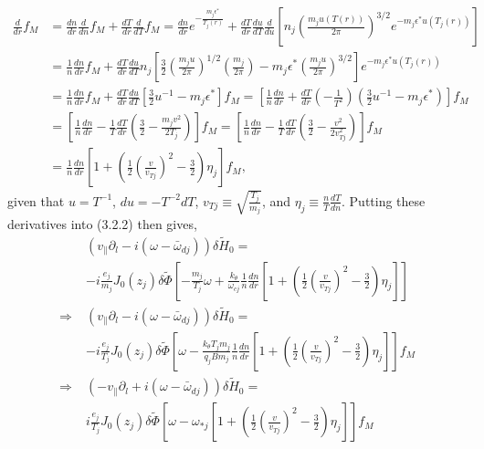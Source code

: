 \documentclass[12pt]{article}
\numberwithin{equation}{subsection}
\begin{document}
   \begin{equation}
   \begin{aligned}
      \frac{d}{dr}f_M &= \frac{dn}{dr}\frac{d}{dn}f_M + \frac{dT}{dr}\frac{d}{dT}f_M = 
                         \frac{dn}{dr}e^{-\frac{m_j \epsilon^*}{T_j(r)}} + 
                         \frac{dT}{dr}\frac{du}{dT}\frac{d}{du}[n_j\left(\frac{m_j u(T(r))}{2\pi}\right)^{3/2}e^{-m_j \epsilon^* u(T_j(r))}] \\
                      &= \frac{1}{n}\frac{dn}{dr}f_M + \frac{dT}{dr}\frac{du}{dT}n_j[\frac{3}{2}\left(\frac{m_ju}{2\pi}\right)^{1/2}
                         \left(\frac{m_j}{2\pi}\right) - m_j\epsilon^*\left(\frac{m_ju}{2\pi}\right)^{3/2}]e^{-m_j \epsilon^* u(T_j(r))} \\
                      &= \frac{1}{n}\frac{dn}{dr}f_M + \frac{dT}{dr}\frac{du}{dT}[\frac{3}{2}u^{-1} - m_j\epsilon^*]f_M
                       = [\frac{1}{n}\frac{dn}{dr} + \frac{dT}{dr}(-\frac{1}{T^2})(\frac{3}{2}u^{-1} - m_j\epsilon^*)]f_M \\
                      &= [\frac{1}{n}\frac{dn}{dr} - \frac{1}{T}\frac{dT}{dr}(\frac{3}{2} - \frac{m_jv^2}{2T_j})]f_M
                       = [\frac{1}{n}\frac{dn}{dr} - \frac{1}{T}\frac{dT}{dr}(\frac{3}{2} - \frac{v^2}{2v_{Tj}^2})]f_M \\
                      &= \frac{1}{n}\frac{dn}{dr}[1 + (\frac{1}{2}\left(\frac{v}{v_{Tj}}\right)^2 - \frac{3}{2})\eta_j]f_M,
   \end{aligned}
   \end{equation}
given that $u = T^{-1}$, $du = -T^{-2}dT$, $v_{Tj} \equiv \sqrt{\frac{T_j}{m_j}}$, and $\eta_j \equiv \frac{n}{T}\frac{dT}{dn}$. Putting these
derivatives into (3.2.2) then gives,
   \begin{equation}
   \begin{aligned}
      &(v_\parallel\partial_l - i(\omega - \bar{\omega}_{dj}))\delta\widetilde{H}_0 =               \\ &-i\frac{e_j}{m_j}J_0(z_j)\delta\widetilde{\Phi}
          [-\frac{m_j}{T_j}\omega + \frac{k_\theta}{\omega_{cj}}\frac{1}{n}\frac{dn}{dr}[1 + (\frac{1}{2}\left(\frac{v}{v_{Tj}}\right)^2 - \frac{3}{2})\eta_j]]      \\
      \Rightarrow\; &(v_\parallel\partial_l - i(\omega - \bar{\omega}_{dj}))\delta\widetilde{H}_0 = \\ &-i\frac{e_j}{T_j}J_0(z_j)\delta\widetilde{\Phi}
          [\omega - \frac{k_\theta T_j m_j}{q_j B m_j}\frac{1}{n}\frac{dn}{dr}[1 + (\frac{1}{2}\left(\frac{v}{v_{Tj}}\right)^2 - \frac{3}{2})\eta_j]]f_M             \\
      \Rightarrow\; &(-v_\parallel\partial_l + i(\omega - \bar{\omega}_{dj}))\delta\widetilde{H}_0 = \\ &i\frac{e_j}{T_j}J_0(z_j)\delta\widetilde{\Phi}
          [\omega - \omega_{*j}[1 + (\frac{1}{2}\left(\frac{v}{v_{Tj}}\right)^2- \frac{3}{2})\eta_j]]f_M
   \end{aligned}
   \end{equation}
\end{document}
